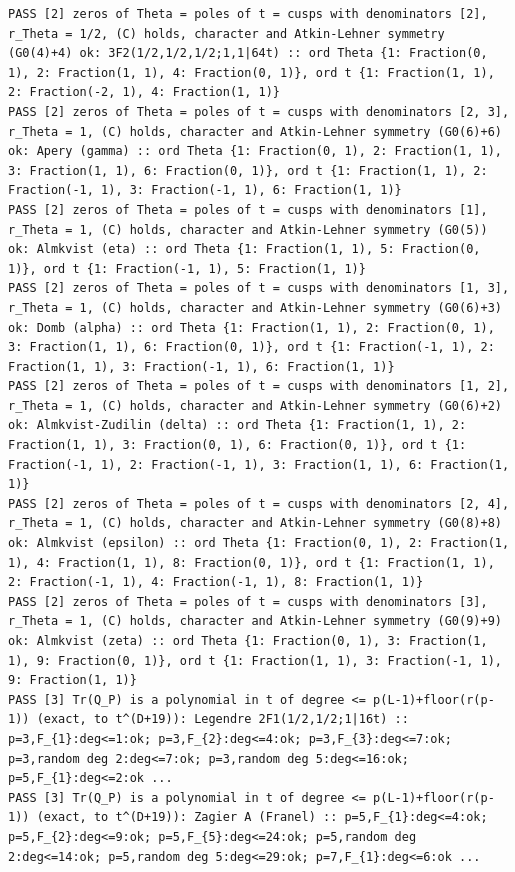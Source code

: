 \documentclass[11pt,a4paper]{article}
\theoremstyle{definition}\newtheorem{definition}[theorem]{Definition}
\theoremstyle{remark}\newtheorem{remark}[theorem]{Remark}
\numberwithin{equation}{section}
\begin{document}
\begin{lstlisting}
PASS [2] zeros of Theta = poles of t = cusps with denominators [2], r_Theta = 1/2, (C) holds, character and Atkin-Lehner symmetry (G0(4)+4) ok: 3F2(1/2,1/2,1/2;1,1|64t) :: ord Theta {1: Fraction(0, 1), 2: Fraction(1, 1), 4: Fraction(0, 1)}, ord t {1: Fraction(1, 1), 2: Fraction(-2, 1), 4: Fraction(1, 1)}
PASS [2] zeros of Theta = poles of t = cusps with denominators [2, 3], r_Theta = 1, (C) holds, character and Atkin-Lehner symmetry (G0(6)+6) ok: Apery (gamma) :: ord Theta {1: Fraction(0, 1), 2: Fraction(1, 1), 3: Fraction(1, 1), 6: Fraction(0, 1)}, ord t {1: Fraction(1, 1), 2: Fraction(-1, 1), 3: Fraction(-1, 1), 6: Fraction(1, 1)}
PASS [2] zeros of Theta = poles of t = cusps with denominators [1], r_Theta = 1, (C) holds, character and Atkin-Lehner symmetry (G0(5)) ok: Almkvist (eta) :: ord Theta {1: Fraction(1, 1), 5: Fraction(0, 1)}, ord t {1: Fraction(-1, 1), 5: Fraction(1, 1)}
PASS [2] zeros of Theta = poles of t = cusps with denominators [1, 3], r_Theta = 1, (C) holds, character and Atkin-Lehner symmetry (G0(6)+3) ok: Domb (alpha) :: ord Theta {1: Fraction(1, 1), 2: Fraction(0, 1), 3: Fraction(1, 1), 6: Fraction(0, 1)}, ord t {1: Fraction(-1, 1), 2: Fraction(1, 1), 3: Fraction(-1, 1), 6: Fraction(1, 1)}
PASS [2] zeros of Theta = poles of t = cusps with denominators [1, 2], r_Theta = 1, (C) holds, character and Atkin-Lehner symmetry (G0(6)+2) ok: Almkvist-Zudilin (delta) :: ord Theta {1: Fraction(1, 1), 2: Fraction(1, 1), 3: Fraction(0, 1), 6: Fraction(0, 1)}, ord t {1: Fraction(-1, 1), 2: Fraction(-1, 1), 3: Fraction(1, 1), 6: Fraction(1, 1)}
PASS [2] zeros of Theta = poles of t = cusps with denominators [2, 4], r_Theta = 1, (C) holds, character and Atkin-Lehner symmetry (G0(8)+8) ok: Almkvist (epsilon) :: ord Theta {1: Fraction(0, 1), 2: Fraction(1, 1), 4: Fraction(1, 1), 8: Fraction(0, 1)}, ord t {1: Fraction(1, 1), 2: Fraction(-1, 1), 4: Fraction(-1, 1), 8: Fraction(1, 1)}
PASS [2] zeros of Theta = poles of t = cusps with denominators [3], r_Theta = 1, (C) holds, character and Atkin-Lehner symmetry (G0(9)+9) ok: Almkvist (zeta) :: ord Theta {1: Fraction(0, 1), 3: Fraction(1, 1), 9: Fraction(0, 1)}, ord t {1: Fraction(1, 1), 3: Fraction(-1, 1), 9: Fraction(1, 1)}
PASS [3] Tr(Q_P) is a polynomial in t of degree <= p(L-1)+floor(r(p-1)) (exact, to t^(D+19)): Legendre 2F1(1/2,1/2;1|16t) :: p=3,F_{1}:deg<=1:ok; p=3,F_{2}:deg<=4:ok; p=3,F_{3}:deg<=7:ok; p=3,random deg 2:deg<=7:ok; p=3,random deg 5:deg<=16:ok; p=5,F_{1}:deg<=2:ok ...
PASS [3] Tr(Q_P) is a polynomial in t of degree <= p(L-1)+floor(r(p-1)) (exact, to t^(D+19)): Zagier A (Franel) :: p=5,F_{1}:deg<=4:ok; p=5,F_{2}:deg<=9:ok; p=5,F_{5}:deg<=24:ok; p=5,random deg 2:deg<=14:ok; p=5,random deg 5:deg<=29:ok; p=7,F_{1}:deg<=6:ok ...

\end{lstlisting}
\end{document}
